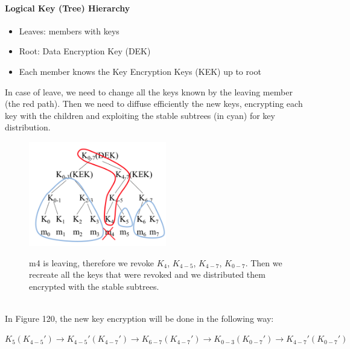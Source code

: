 \documentclass[10pt,a4paper]{article}
\begin{document}
\paragraph{Logical Key (Tree) Hierarchy}
\begin{itemize}
	\item Leaves: members with keys
	\item Root: Data Encryption Key (DEK)
	\item Each member knows the Key Encryption Keys (KEK) up to root
\end{itemize}
In case of leave, we need to change all the keys known by the leaving member (the red path). Then we need to diffuse efficiently the new keys, encrypting each key with the children and exploiting the stable subtrees (in cyan) for key distribution.
\begin{figure}[h!]\hfill \includegraphics[width=170pt]{images/logical-key-tree.png}\hspace*{\fill}
  \label{fig:logical-key-tree}
  \caption{m4 is leaving, therefore we revoke $K_4$, $K_{4-5}$, $K_{4-7}$, $K_{0-7}$. Then we recreate all the keys that were revoked and we distributed them encrypted with the stable subtrees.}
\end{figure} \\
In Figure 120, the new key encryption will be done in the following way:
\begin{description}
	\item $K_5(K_{4-5}') \rightarrow K_{4-5}'(K_{4-7}') \rightarrow K_{6-7}(K_{4-7}') \rightarrow K_{0-3}(K_{0-7}') \rightarrow K_{4-7}'(K_{0-7}')$
\end{description}
\end{document}
